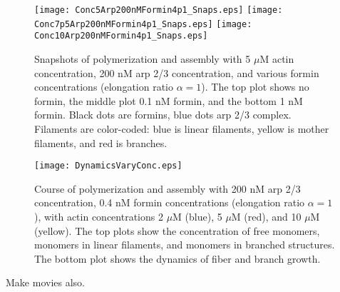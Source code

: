 \documentclass[11pt]{article}
\begin{document}
\begin{figure}
\centering
\texttt{[image: Conc5Arp200nMFormin4p1\_Snaps.eps]}
\texttt{[image: Conc7p5Arp200nMFormin4p1\_Snaps.eps]}
\texttt{[image: Conc10Arp200nMFormin4p1\_Snaps.eps]}
\caption{\label{fig:ForminArpsSnaps}Snapshots of polymerization and assembly with 5 $\mu$M actin concentration, 200 nM arp 2/3 concentration, and various formin concentrations (elongation ratio $\alpha=1$). The top plot shows no formin, the middle plot 0.1 nM formin, and the bottom 1 nM formin. Black dots are formins, blue dots arp 2/3 complex. Filaments are color-coded: blue is linear filaments, yellow is mother filaments, and red is branches.}
\end{figure}




\begin{figure}
\centering
\texttt{[image: DynamicsVaryConc.eps]}
\caption{\label{fig:ActinConc}Course of polymerization and assembly with 200 nM arp 2/3 concentration, 0.4 nM formin concentrations (elongation ratio $\alpha=1$), with actin concentrations 2 $\mu$M (blue), 5 $\mu$M (red), and 10 $\mu$M (yellow). The top plots show the concentration of free monomers, monomers in linear filaments, and monomers in branched structures. The bottom plot shows the dynamics of fiber and branch growth. }
\end{figure}
Make movies also.






\end{document}
